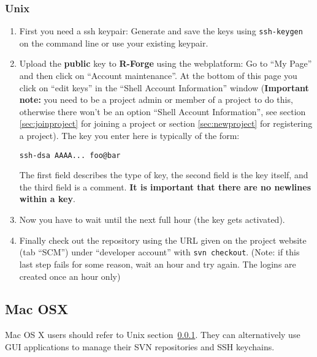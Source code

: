 \documentclass[a4paper]{article}
\begin{document}
\subsubsection{Unix}
\label{sec:scm-unix}

\begin{enumerate}
\item First you need a ssh keypair: Generate and save the keys
  using \texttt{ssh-keygen} on the command line or use your existing keypair.  
\item Upload the \textbf{public} key to \textbf{R-Forge} using the webplatform: Go to
  ``My Page'' and then click on ``Account maintenance''. At the bottom
  of this page you click on ``edit keys'' in the ``Shell Account
  Information'' window (\textbf{Important note:} you need to be a project admin
  or member of a project to do this, otherwise there won't be an
  option ``Shell Account Information'', see section
  \ref{sec:joinproject} for joining a project or section
  \ref{sec:newproject} for registering a project).
  The key you enter here is typically of the form:
\begin{verbatim}
ssh-dsa AAAA... foo@bar
\end{verbatim}
  The first field
  describes the type of key, the second field is the key itself, and
  the third field is a comment. \textbf{It is important that there are
    no newlines within a key}.
\item Now you have to wait until the next full hour (the key gets activated).
\item Finally check out the repository using the URL given on the
  project website (tab ``SCM'') under ``developer account'' with
  \texttt{svn checkout}. (Note: if this last step
  fails for some reason, wait an hour and try again. The logins are
  created once an hour only)
\end{enumerate}

\subsection{Mac OSX}
\label{sec:scm-macosx}
Mac OS X users should refer to Unix section~\ref{sec:scm-unix}. They
can alternatively use GUI applications to manage their SVN
repositories and SSH keychains.
\end{document}
